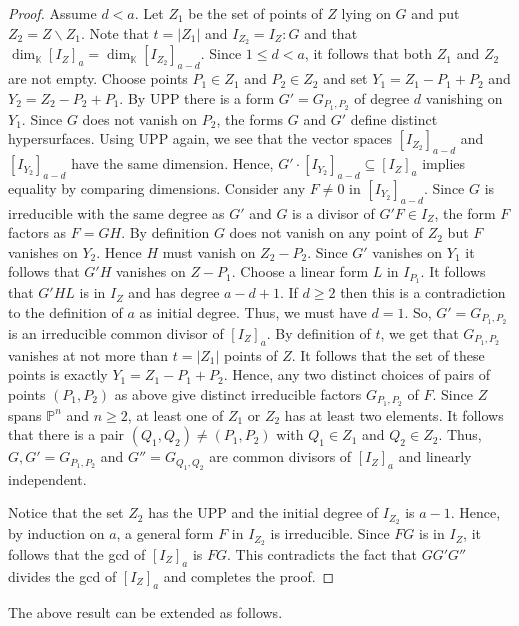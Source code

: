 \documentclass[12pt]{amsart}%
\numberwithin{equation}{section}
\theoremstyle{definition}
\numberwithin{equation}{section}
\newcommand{\PP}{ \ensuremath{\mathbb{P}}}
\begin{document}
\begin{proof}
Assume $d < a$. Let $Z_1$ be the set of points of $Z$ lying on $G$ and put $Z_2 = Z \backslash Z_1$. Note that $t = |Z_1|$ and 
$I_{Z_2} = I_Z : G$ and that $\dim_\mathbb{K} [I_Z ]_a = \dim_\mathbb{K}[I_{Z_2} ]_{a-d}$. Since $1 \le d < a$, it follows that both $Z_1$ and $Z_2$ are not empty. Choose points $P_1 \in Z_1$ and $P_2 \in Z_2$ and set $Y_1 = Z_1 - P_1 + P_2$ and $Y_2 = Z_2 - P_2 + P_1$. 
By UPP there is a form $G' = G_{P_1, P_2}$ of degree $d$ vanishing on $Y_1$. Since $G$ does not vanish on $P_2$, the forms $G$ and $G'$ define distinct hypersurfaces. Using UPP again, we see that the vector spaces $[I_{Z_2}]_{a-d}$ and $[I_{Y_2}]_{a-d}$ have the same dimension. Hence, $G' \cdot [I_{Y_2}]_{a-d} \subseteq [I_{Z}]_{a}$ implies equality by comparing dimensions. Consider any $F \neq 0$ in $[I_{Y_2}]_{a-d}$. Since $G$ is irreducible with the same degree 
as $G'$ and $G$ is a divisor of $G' F \in I_Z$, the form $F$ factors as $F = G H$. By definition $G$ does not vanish on any point of $Z_2$ but $F$ vanishes on $Y_2$. Hence $H$ must vanish on $Z_2 - P_2$. Since $G'$ vanishes on $Y_1$ it follows that $G' H$ vanishes on $Z - P_1$. Choose a linear form $L$ in $I_{P_1}$. It follows that $G' H L$ is in $I_Z$ 
and has degree $a - d + 1$. If $d \ge 2$ then this is a contradiction to the definition of $a$ as initial degree. Thus, we must have $d =1$. So, $G' = G_{P_1, P_2}$ is an irreducible common divisor of $[I_Z]_a$. By definition of $t$, we get that $G_{P_1, P_2}$ vanishes at not more than $t  = |Z_1|$ points of $Z$. It follows that the set of these points is exactly $Y_1 = Z_1 -P_1 + P_2$. Hence,  any two distinct choices of pairs of points $(P_1, P_2)$ as above give distinct irreducible factors $G_{P_1, P_2}$ of $F$. 
Since $Z$ spans $\PP^n$ and $n \ge 2$, at least one of $Z_1$ or $Z_2$ has at least two elements. It follows that there is a pair $(Q_1, Q_2) \neq (P_1, P_2)$ with $Q_1 \in Z_1$ and $Q_2 \in Z_2$. Thus, $G, G' = G_{P_1, P_2}$ and $G'' = G_{Q_1, Q_2}$ are common divisors of $[I_Z]_a$ and linearly independent. 

Notice that the set $Z_2$ has the UPP and the initial degree of $I_{Z_2}$ is $a-1$. Hence, by induction on $a$, a general form $F$ in $I_{Z_2}$ is irreducible. Since $F G$ is in $I_Z$, it follows that the gcd of $[I_Z]_a$ is $FG$. This contradicts the fact that $G G'  G''$ divides the gcd of $[I_Z]_a$ and completes the proof. 
\end{proof}

The above result can be extended as follows. 
\end{document}
